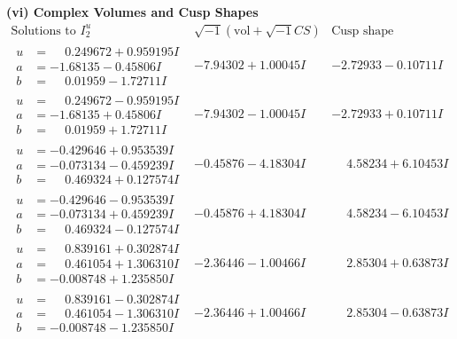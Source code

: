\documentclass[1p]{elsarticle_modified}
\theoremstyle{definition}
\newcommand{\I}{\sqrt{-1}}
\begin{document}
\newpage\flushleft \textbf{(vi) Complex Volumes and Cusp Shapes}
$$\begin{array}{c|c|c}  
\text{Solutions to }I^u_{2}& \I (\text{vol} + \sqrt{-1}CS) & \text{Cusp shape}\\
 \hline 
\begin{aligned}
u &= \phantom{-}0.249672 + 0.959195 I \\
a &= -1.68135 - 0.45806 I \\
b &= \phantom{-}0.01959 - 1.72711 I\end{aligned}
 & -7.94302 + 1.00045 I & -2.72933 - 0.10711 I \\ \hline\begin{aligned}
u &= \phantom{-}0.249672 - 0.959195 I \\
a &= -1.68135 + 0.45806 I \\
b &= \phantom{-}0.01959 + 1.72711 I\end{aligned}
 & -7.94302 - 1.00045 I & -2.72933 + 0.10711 I \\ \hline\begin{aligned}
u &= -0.429646 + 0.953539 I \\
a &= -0.073134 - 0.459239 I \\
b &= \phantom{-}0.469324 + 0.127574 I\end{aligned}
 & -0.45876 - 4.18304 I & \phantom{-}4.58234 + 6.10453 I \\ \hline\begin{aligned}
u &= -0.429646 - 0.953539 I \\
a &= -0.073134 + 0.459239 I \\
b &= \phantom{-}0.469324 - 0.127574 I\end{aligned}
 & -0.45876 + 4.18304 I & \phantom{-}4.58234 - 6.10453 I \\ \hline\begin{aligned}
u &= \phantom{-}0.839161 + 0.302874 I \\
a &= \phantom{-}0.461054 + 1.306310 I \\
b &= -0.008748 + 1.235850 I\end{aligned}
 & -2.36446 - 1.00466 I & \phantom{-}2.85304 + 0.63873 I \\ \hline\begin{aligned}
u &= \phantom{-}0.839161 - 0.302874 I \\
a &= \phantom{-}0.461054 - 1.306310 I \\
b &= -0.008748 - 1.235850 I\end{aligned}
 & -2.36446 + 1.00466 I & \phantom{-}2.85304 - 0.63873 I \\ \hline\begin{aligned}

\end{aligned}
\end{array}$$
\end{document}
